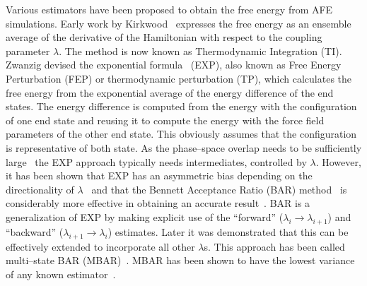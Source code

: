 \documentclass[journal=jctcce,manuscript=article]{achemso}
\begin{document}
Various estimators have been proposed to obtain the free energy from AFE 
simulations.  Early work by Kirkwood~\cite{kirkwood_statistical_1935} expresses 
the free energy as an ensemble average of the derivative of the
Hamiltonian with respect to the coupling parameter $\lambda$.  The
method is now known as Thermodynamic Integration (TI).  Zwanzig
devised the exponential formula~\cite{zwanzig_high-temperature_1954}
(EXP), also known as Free Energy Perturbation (FEP) or thermodynamic
perturbation (TP), which calculates the free energy from the
exponential average of the energy difference of the end states.  The
energy difference is computed from the energy with the configuration of one end 
state and reusing it to compute the energy with the force field parameters of 
the other end state.  This obviously assumes that the configuration is
representative of both state.  As the phase--space overlap needs to
be sufficiently large~\cite{wu_phase-space_2005,
  wu_phase-space_2005-1} the EXP approach typically needs
intermediates, controlled by $\lambda$.  However, it has been shown
that EXP has an asymmetric bias depending on the directionality of
$\lambda$~\cite{wu_asymmetric_2004} and that the Bennett Acceptance
Ratio (BAR) method~\cite{bennett_efficient_1976} is considerably more
effective in obtaining an accurate result~\cite{lu_appropriate_2003}.
BAR is a generalization of EXP by making explicit use of the
``forward'' ($\lambda_i \rightarrow \lambda_{i+1}$) and ``backward''
($\lambda_{i+1} \rightarrow \lambda_i$) estimates.  Later it was
demonstrated that this can be effectively extended to incorporate all
other $\lambda$s.  This approach has been called multi--state BAR
(MBAR)~\cite{shirts_statistically_2008-1}.  MBAR has been shown
to have the lowest variance of any known
estimator~\cite{shirts_statistically_2008}.
\end{document}
